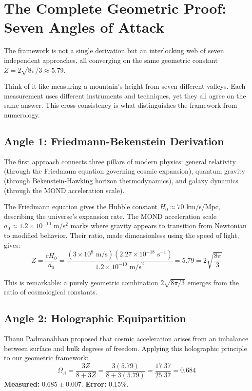 \documentclass[11pt,a4paper]{article}
\theoremstyle{plain}
\theoremstyle{definition}
\theoremstyle{remark}
\newcommand{\OmegaL}{\Omega_\Lambda}
\begin{document}
\section{The Complete Geometric Proof: Seven Angles of Attack}

The framework is not a single derivation but an interlocking web of seven independent approaches, all converging on the same geometric constant $Z = 2\sqrt{8\pi/3} \approx 5.79$.

Think of it like measuring a mountain's height from seven different valleys. Each measurement uses different instruments and techniques, yet they all agree on the same answer. This cross-consistency is what distinguishes the framework from numerology.

\subsection{Angle 1: Friedmann-Bekenstein Derivation}

The first approach connects three pillars of modern physics: general relativity (through the Friedmann equation governing cosmic expansion), quantum gravity (through Bekenstein-Hawking horizon thermodynamics), and galaxy dynamics (through the MOND acceleration scale).

The Friedmann equation gives the Hubble constant $H_0 \approx 70$ km/s/Mpc, describing the universe's expansion rate. The MOND acceleration scale $a_0 \approx 1.2 \times 10^{-10}$ m/s$^2$ marks where gravity appears to transition from Newtonian to modified behavior. Their ratio, made dimensionless using the speed of light, gives:
\[
Z = \frac{c H_0}{a_0} = \frac{(3 \times 10^8 \text{ m/s})(2.27 \times 10^{-18} \text{ s}^{-1})}{1.2 \times 10^{-10} \text{ m/s}^2} = 5.79 = 2\sqrt{\frac{8\pi}{3}}
\]

This is remarkable: a purely geometric combination $2\sqrt{8\pi/3}$ emerges from the ratio of cosmological constants.

\subsection{Angle 2: Holographic Equipartition}

Thanu Padmanabhan proposed that cosmic acceleration arises from an imbalance between surface and bulk degrees of freedom. Applying this holographic principle to our geometric framework:
\[
\OmegaL = \frac{3Z}{8 + 3Z} = \frac{3(5.79)}{8 + 3(5.79)} = \frac{17.37}{25.37} = 0.684
\]
\textbf{Measured:} $0.685 \pm 0.007$. \textbf{Error:} 0.15\%.
\end{document}
